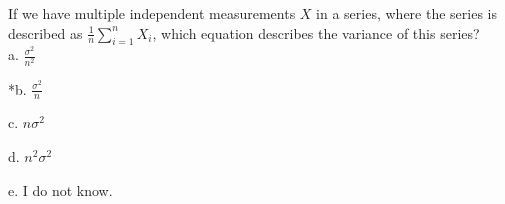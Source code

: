 
If we have multiple independent measurements \(X\) in a series, where the
series is described as \(\frac{1}{n}\sum_{i=1}^{n}X_{i}\), which
equation describes the variance of this series?\\

a. \(\frac{\sigma^{2}}{n^{2}}\)

*b. \(\frac{\sigma^{2}}{n^{}}\)

c. \(n\sigma^{2}\)

d. \(n^{2}\sigma^{2}\)

e. I do not know.\\
